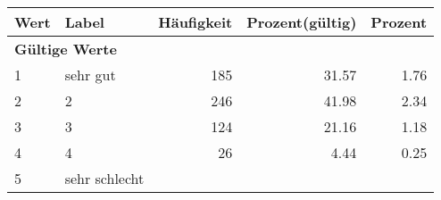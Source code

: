      \begin{longtable}{lXrrr}
     \toprule
     \textbf{Wert} & \textbf{Label} & \textbf{Häufigkeit} & \textbf{Prozent(gültig)} & \textbf{Prozent} \\
     \endhead
     \midrule
     \multicolumn{5}{l}{\textbf{Gültige Werte}}\\

     1 &
     \multicolumn{1}{X}{ sehr gut   } &


       \num{185} &
       \num[round-mode=places,round-precision=2]{31,57} &
         \num[round-mode=places,round-precision=2]{1,76} \\

     2 &
     \multicolumn{1}{X}{ 2   } &


       \num{246} &
       \num[round-mode=places,round-precision=2]{41,98} &
         \num[round-mode=places,round-precision=2]{2,34} \\

     3 &
     \multicolumn{1}{X}{ 3   } &


       \num{124} &
       \num[round-mode=places,round-precision=2]{21,16} &
         \num[round-mode=places,round-precision=2]{1,18} \\

     4 &
     \multicolumn{1}{X}{ 4   } &


       \num{26} &
       \num[round-mode=places,round-precision=2]{4,44} &
         \num[round-mode=places,round-precision=2]{0,25} \\

     5 &
     \multicolumn{1}{X}{ sehr schlecht   } &



\end{longtable}
